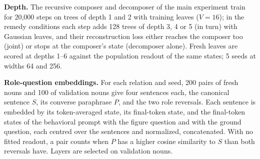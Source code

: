 \documentclass[10pt]{article}
\theoremstyle{plain}
\theoremstyle{remark}
\begin{document}
\textbf{Depth.} The recursive composer and decomposer of the main experiment train for 20{,}000 steps on trees of depth 1 and 2 with training leaves ($V = 16$); in the remedy conditions each step adds 128 trees of depth 3, 4 or 5 (in turn) with Gaussian leaves, and their reconstruction loss either reaches the composer too (joint) or stops at the composer's state (decomposer alone). Fresh leaves are scored at depths 1--6 against the population readout of the same states; 5 seeds at widths 64 and 256.

\textbf{Role-question embeddings.} For each relation and seed, 200 pairs of fresh nouns and 100 of validation nouns give four sentences each, the canonical sentence $S$, its converse paraphrase $P$, and the two role reversals. Each sentence is embedded by its token-averaged state, its final-token state, and the final-token states of the behavioral prompt with the figure question and with the ground question, each centred over the sentences and normalized, concatenated. With no fitted readout, a pair counts when $P$ has a higher cosine similarity to $S$ than both reversals have. Layers are selected on validation nouns.
\end{document}
